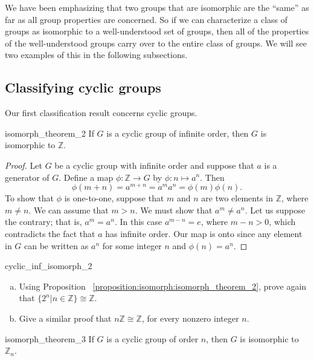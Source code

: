 We have been emphasizing that two groups that are isomorphic are the ``same'' as far as all group properties are concerned. So if we can characterize a class of groups as isomorphic to a well-understood set of groups, then all of the properties of the well-understood groups carry over to the entire class of groups. We will see two examples of this in the following subsections.

\subsection{Classifying cyclic groups}\label{ClassificationOfCylic}

Our first classification result concerns cyclic groups.

\begin{prop}{isomorph_theorem_2}
If $G$ is a  cyclic group of infinite order, then $G$ is isomorphic to ${\mathbb Z}$.
\end{prop}

\begin{proof}
Let $G$ be a cyclic group with infinite order and suppose that $a$ is a generator of $G$.  Define a map $\phi : {\mathbb Z} \rightarrow  G$ by $\phi : n \mapsto a^n$. Then 
\[
\phi( m+n ) = a^{m+n} = a^m a^n = \phi( m ) \phi( n ).
\]
To show that $\phi$ is one-to-one, suppose that $m$ and $n$ are two elements in ${\mathbb Z}$, where $m \neq n$.  We can assume that $m > n$.  We must show that $a^m \neq a^n$. Let us suppose the contrary; that is, $a^m = a^n$. In this case $a^{m - n} = e$, where $m - n>0$, which contradicts the fact that $a$ has infinite order.  Our map is onto since any element in $G$ can be written as $a^n$ for some integer $n$ and $\phi(n) = a^n$.   
\end{proof}

\begin{exercise}{cyclic_inf_isomorph_2}
\begin{enumerate}[(a)]
\item
Using Proposition ~\ref{proposition:isomorph:isomorph_theorem_2}, prove again that $\{2^n | n \in {\mathbb Z} \} \cong {\mathbb Z}$.
\item
Give a similar proof that $n{\mathbb Z} \cong {\mathbb Z}$, for every nonzero integer $n$.
\end{enumerate}
\end{exercise}


\begin{prop}{isomorph_theorem_3}
If $G$ is a cyclic group of order $n$, then $G$ is isomorphic to~${\mathbb Z}_n$.  
\end{prop}
 
